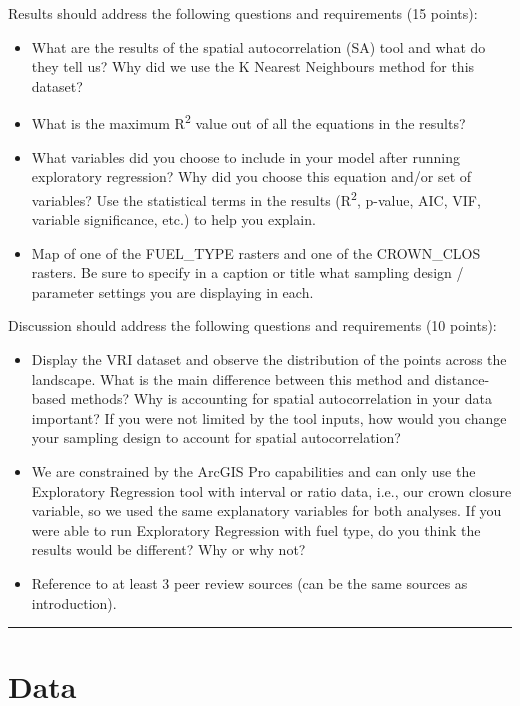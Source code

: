 \documentclass[
]{book}
\begin{document}
Results should address the following questions and requirements (15 points):

\begin{itemize}
\item
  What are the results of the spatial autocorrelation (SA) tool and what do they tell us? Why did we use the K Nearest Neighbours method for this dataset?
\item
  What is the maximum R\textsuperscript{2} value out of all the equations in the results?
\item
  What variables did you choose to include in your model after running exploratory regression? Why did you choose this equation and/or set of variables? Use the statistical terms in the results (R\textsuperscript{2}, p-value, AIC, VIF, variable significance, etc.) to help you explain.
\item
  Map of one of the FUEL\_TYPE rasters and one of the CROWN\_CLOS rasters. Be sure to specify in a caption or title what sampling design / parameter settings you are displaying in each.
\end{itemize}

Discussion should address the following questions and requirements (10 points):

\begin{itemize}
\item
  Display the VRI dataset and observe the distribution of the points across the landscape. What is the main difference between this method and distance-based methods? Why is accounting for spatial autocorrelation in your data important? If you were not limited by the tool inputs, how would you change your sampling design to account for spatial autocorrelation?
\item
  We are constrained by the ArcGIS Pro capabilities and can only use the Exploratory Regression tool with interval or ratio data, i.e., our crown closure variable, so we used the same explanatory variables for both analyses. If you were able to run Exploratory Regression with fuel type, do you think the results would be different? Why or why not?
\item
  Reference to at least 3 peer review sources (can be the same sources as introduction).
\end{itemize}

\begin{center}\rule{0.5\linewidth}{0.5pt}\end{center}

\hypertarget{lab4-data}{%
\section*{Data}\label{lab4-data}}
\end{document}
